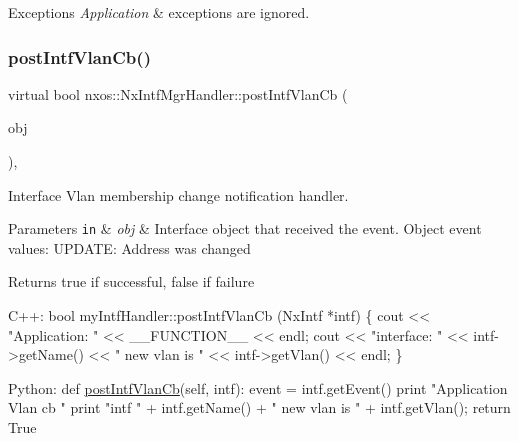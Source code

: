\begin{DoxyExceptions}{Exceptions}
{\em Application} & exceptions are ignored. \\
\hline
\end{DoxyExceptions}
\mbox{\label{classnxos_1_1_nx_intf_mgr_handler_aad14cab2e803ceadef82870303db526c}} 
\subsubsection{\texorpdfstring{post\+Intf\+Vlan\+Cb()}{postIntfVlanCb()}}
{\footnotesize\ttfamily virtual bool nxos\+::\+Nx\+Intf\+Mgr\+Handler\+::post\+Intf\+Vlan\+Cb (\begin{DoxyParamCaption}\item[{\mbox{\hyperlink{classnxos_1_1_nx_intf}{Nx\+Intf}} $\ast$}]{obj }\end{DoxyParamCaption})\hspace{0.3cm}{\ttfamily [inline]}, {\ttfamily [virtual]}}

Interface Vlan membership change notification handler. 
\begin{DoxyParams}[1]{Parameters}
\mbox{\tt in}  & {\em obj} & Interface object that received the event. Object event values\+: U\+P\+D\+A\+TE\+: Address was changed \\
\hline
\end{DoxyParams}
\begin{DoxyReturn}{Returns}
true if successful, false if failure
\end{DoxyReturn}

\begin{DoxyCode}
C++:
   \textcolor{keywordtype}{bool}  myIntfHandler::postIntfVlanCb (NxIntf *intf)
   \{
      cout << \textcolor{stringliteral}{"Application: "} << \_\_FUNCTION\_\_ << endl;
      cout << \textcolor{stringliteral}{"interface: "} << intf->getName() << 
           \textcolor{stringliteral}{" new vlan is "} << intf->getVlan() << endl;
   \}

Python:   
   def \mbox{\hyperlink{classnxos_1_1_nx_intf_mgr_handler_aad14cab2e803ceadef82870303db526c}{postIntfVlanCb}}(\textcolor{keyword}{self}, intf):
       event = intf.getEvent()
       print \textcolor{stringliteral}{"Application Vlan cb "}
       print \textcolor{stringliteral}{"intf "} + intf.getName() + \textcolor{stringliteral}{" new vlan is "} + 
         intf.getVlan();
       \textcolor{keywordflow}{return} True
\end{DoxyCode}



